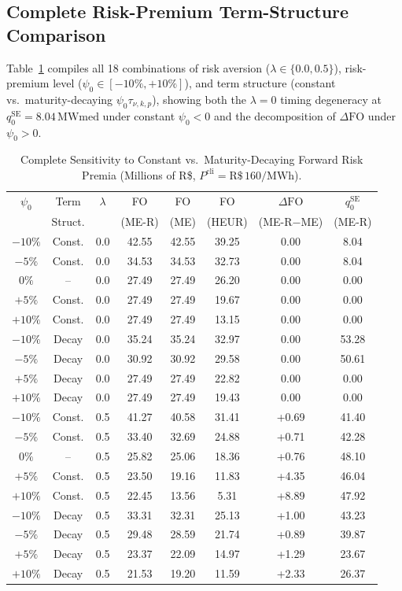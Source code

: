 \documentclass[10pt,journal]{IEEEtran}
\begin{document}
\subsection{Complete Risk-Premium Term-Structure Comparison}
Table~\ref{tab:supp_premio} compiles all 18 combinations of risk aversion ($\lambda \in \{0.0, 0.5\}$), risk-premium level ($\psi_0 \in [-10\%, +10\%]$), and term structure (constant vs.\ maturity-decaying $\psi_0 \tau_{\nu,k,p}$), showing both the $\lambda=0$ timing degeneracy at $q_0^{\text{SE}} = 8.04\,\text{MWmed}$ under constant $\psi_0 < 0$ and the decomposition of $\Delta\mathrm{FO}$ under $\psi_0 > 0$.

\begin{table}[htbp]
\centering
\caption{Complete Sensitivity to Constant vs.\ Maturity-Decaying Forward Risk Premia (Millions of R\$, $P^{\text{cli}} = \text{R\$}\,160/\text{MWh}$).}
\label{tab:supp_premio}
\scriptsize
\setlength{\tabcolsep}{1.8pt}
\begin{tabular}{cccccccc}
\toprule
$\psi_0$ & Term & $\lambda$ & FO & FO & FO & $\Delta\mathrm{FO}$ & $q_0^{\text{SE}}$ \\
 & Struct. & & (ME-R) & (ME) & (HEUR) & (ME-R$-$ME) & (ME-R) \\
\midrule
$-10\%$ & Const. & 0.0 & 42.55 & 42.55 & 39.25 & 0.00 & 8.04 \\
$-5\%$  & Const. & 0.0 & 34.53 & 34.53 & 32.73 & 0.00 & 8.04 \\
$0\%$   & --     & 0.0 & 27.49 & 27.49 & 26.20 & 0.00 & 0.00 \\
$+5\%$  & Const. & 0.0 & 27.49 & 27.49 & 19.67 & 0.00 & 0.00 \\
$+10\%$ & Const. & 0.0 & 27.49 & 27.49 & 13.15 & 0.00 & 0.00 \\
\midrule
$-10\%$ & Decay  & 0.0 & 35.24 & 35.24 & 32.97 & 0.00 & 53.28 \\
$-5\%$  & Decay  & 0.0 & 30.92 & 30.92 & 29.58 & 0.00 & 50.61 \\
$+5\%$  & Decay  & 0.0 & 27.49 & 27.49 & 22.82 & 0.00 & 0.00 \\
$+10\%$ & Decay  & 0.0 & 27.49 & 27.49 & 19.43 & 0.00 & 0.00 \\
\midrule
$-10\%$ & Const. & 0.5 & 41.27 & 40.58 & 31.41 & +0.69 & 41.40 \\
$-5\%$  & Const. & 0.5 & 33.40 & 32.69 & 24.88 & +0.71 & 42.28 \\
$0\%$   & --     & 0.5 & 25.82 & 25.06 & 18.36 & +0.76 & 48.10 \\
$+5\%$  & Const. & 0.5 & 23.50 & 19.16 & 11.83 & +4.35 & 46.04 \\
$+10\%$ & Const. & 0.5 & 22.45 & 13.56 & 5.31  & +8.89 & 47.92 \\
\midrule
$-10\%$ & Decay  & 0.5 & 33.31 & 32.31 & 25.13 & +1.00 & 43.23 \\
$-5\%$  & Decay  & 0.5 & 29.48 & 28.59 & 21.74 & +0.89 & 39.87 \\
$+5\%$  & Decay  & 0.5 & 23.37 & 22.09 & 14.97 & +1.29 & 23.67 \\
$+10\%$ & Decay  & 0.5 & 21.53 & 19.20 & 11.59 & +2.33 & 26.37 \\
\bottomrule
\end{tabular}
\end{table}



\end{document}
